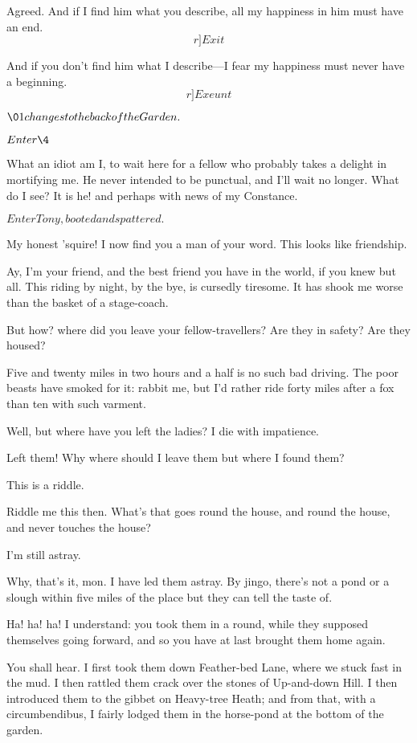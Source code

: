 \documentclass{book}
\begin{document}
\1  Agreed.  And if I find him what you describe, all my
happiness in him must have an end.  \[r]Exit\]

\8  And if you don't find him what I describe---I fear my
happiness must never have a beginning.  \[r]Exeunt\]


\(\01 changes to the back of the Garden.\)


\(Enter \4\)


\4  What an idiot am I, to wait here for a fellow who probably
takes a delight in mortifying me.  He never intended to be punctual,
and I'll wait no longer.  What do I see?  It is he! and perhaps with
news of my Constance.


\(Enter Tony, booted and spattered.\)


\4  My honest 'squire!  I now find you a man of your word. 
This looks like friendship.

\5  Ay, I'm your friend, and the best friend you have in the world,
if you knew but all.  This riding by night, by the bye, is cursedly
tiresome.  It has shook me worse than the basket of a stage-coach.

\4  But how? where did you leave your fellow-travellers?  Are
they in safety?  Are they housed?

\5  Five and twenty miles in two hours and a half is no such bad
driving.  The poor beasts have smoked for it: rabbit me, but I'd rather
ride forty miles after a fox than ten with such varment.

\4  Well, but where have you left the ladies?  I die with
impatience.

\5  Left them!  Why where should I leave them but where I found
them?

\4  This is a riddle.

\5  Riddle me this then.  What's that goes round the house, and
round the house, and never touches the house?

\4  I'm still astray.

\5  Why, that's it, mon.  I have led them astray.  By jingo,
there's not a pond or a slough within five miles of the place but they
can tell the taste of.

\4  Ha! ha! ha! I understand: you took them in a round, while
they supposed themselves going forward, and so you have at last brought
them home again.

\5  You shall hear.  I first took them down Feather-bed Lane, where
we stuck fast in the mud.  I then rattled them crack over the stones of
Up-and-down Hill.  I then introduced them to the gibbet on Heavy-tree
Heath; and from that, with a circumbendibus, I fairly lodged them in
the horse-pond at the bottom of the garden.
\end{document}
